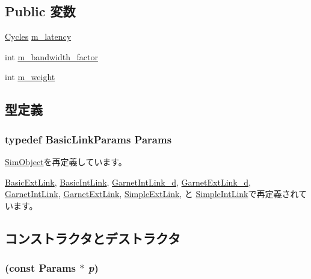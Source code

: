 \subsection*{Public 変数}
\begin{DoxyCompactItemize}
\item 
\hyperlink{classCycles}{Cycles} \hyperlink{classBasicLink_a7599697a6c831356525c7d97604edd31}{m\_\-latency}
\item 
int \hyperlink{classBasicLink_acf83363c1d57f479c74420a1fdcf035d}{m\_\-bandwidth\_\-factor}
\item 
int \hyperlink{classBasicLink_a7433e72c366862b58f3fcf177831dd2e}{m\_\-weight}
\end{DoxyCompactItemize}


\subsection{型定義}
\hypertarget{classBasicLink_a2c371814143f1675a601e935bfbd756c}{
\subsubsection[{Params}]{\setlength{\rightskip}{0pt plus 5cm}typedef BasicLinkParams {\bf Params}}}
\label{classBasicLink_a2c371814143f1675a601e935bfbd756c}


\hyperlink{classSimObject_a0f0761d2db586a23bb2a2880b8f387bb}{SimObject}を再定義しています。

\hyperlink{classBasicExtLink_a124f6e2dedf13bd42661a62b7e155cee}{BasicExtLink}, \hyperlink{classBasicIntLink_a22036d2d68b49d72b25678790aae2c9e}{BasicIntLink}, \hyperlink{classGarnetIntLink__d_a2e35ff7b9010a16d0099e9c6017f4fac}{GarnetIntLink\_\-d}, \hyperlink{classGarnetExtLink__d_a6260fe1aace0793dc83922905dbd435f}{GarnetExtLink\_\-d}, \hyperlink{classGarnetIntLink_ac67f1fad0686704820c88642f65ddcce}{GarnetIntLink}, \hyperlink{classGarnetExtLink_abc394670035aa22f4cda698826986c13}{GarnetExtLink}, \hyperlink{classSimpleExtLink_a0653c80078cb239e9c7e87cfaead7ec9}{SimpleExtLink}, と \hyperlink{classSimpleIntLink_a16df42348b8967c4cc4aa2b9c9fafdf9}{SimpleIntLink}で再定義されています。

\subsection{コンストラクタとデストラクタ}
\hypertarget{classBasicLink_af091b64081caf23401757ab96502e927}{
\subsubsection[{BasicLink}]{ (const {\bf Params} $\ast$ {\em p})}}
\label{classBasicLink_af091b64081caf23401757ab96502e927}



